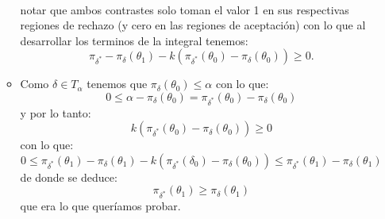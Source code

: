 \begin{itemize}[label=\color{red}\textbullet, leftmargin=*]
\begin{itemize}[label=\textbullet]
\[\begin{array}{c}
        \end{array}
\] 
notar que ambos contrastes solo toman el valor 1 en sus respectivas regiones de rechazo (y cero en las regiones de aceptación) con lo que al desarrollar los terminos de la integral tenemos: \[
\pi_{\delta^*}-\pi_\delta(\theta_1)-k(\pi_{\delta^*}(\theta_0)-\pi_\delta(\theta_0))\ge 0.
\]
\item Como $\delta\in T_\alpha$ tenemos que $\pi_\delta(\theta_0)\le \alpha$ con lo que: \[
0\le \alpha-\pi_\delta(\theta_0)=\pi_{\delta^*}(\theta_0)-\pi_\delta(\theta_0)
\] y por lo tanto: \[
k(\pi_{\delta^*}(\theta_0)-\pi_\delta(\theta_0))\ge 0
\] con lo que: \[
0\le \pi_{\delta^*}(\theta_1)-\pi_\delta(\theta_1)-k(\pi_{\delta^*}(\delta_0)-\pi_\delta(\theta_0))\le \pi_{\delta^*}(\theta_1)-\pi_\delta(\theta_1)
\] de donde se deduce: \[
\pi_{\delta^*}(\theta_1)\ge \pi_\delta(\theta_1)
\] que era lo que queríamos probar.
        \end{itemize}
\end{itemize}
